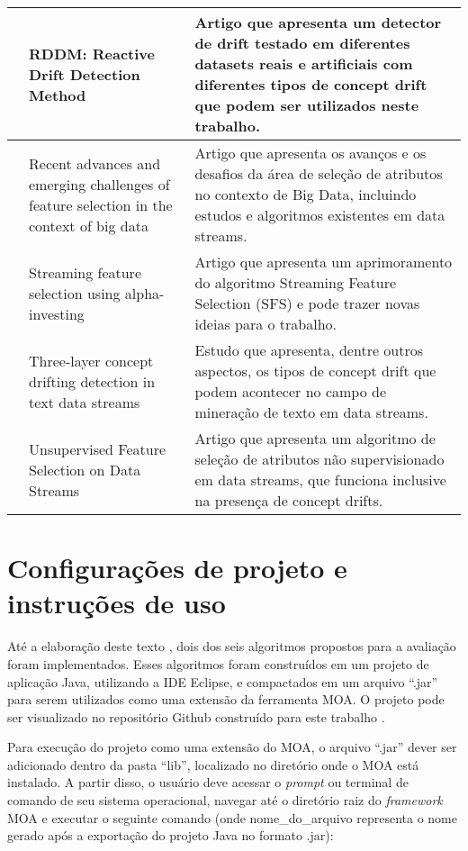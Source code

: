 \begin{longtable}[c]{|p{2.7cm}|p{5cm}|p{7cm}|}
\\ \hline
\cite{Barros2017} & RDDM: Reactive Drift Detection Method & Artigo que apresenta um detector de drift testado em diferentes datasets reais e artificiais com diferentes tipos de concept drift que podem ser utilizados neste trabalho.
\\ \hline
\cite{Bolon-Canedo2015} & Recent advances and emerging challenges of feature selection in the context of big data & Artigo que apresenta os avanços e os desafios da área de seleção de atributos no contexto de Big Data, incluindo estudos e algoritmos existentes em data streams.
\\ \hline
\cite{Zhou2005} & Streaming feature selection using alpha-investing & Artigo que apresenta um aprimoramento do algoritmo Streaming Feature Selection (SFS) e pode trazer novas ideias para o trabalho.
\\ \hline
\cite{Zhang2017} & Three-layer concept drifting detection in text data streams & Estudo que apresenta, dentre outros aspectos, os tipos de concept drift que podem acontecer no campo de mineração de texto em data streams.
\\ \hline
\cite{Huang2015} & Unsupervised Feature Selection on Data Streams & Artigo que apresenta um algoritmo de seleção de atributos não supervisionado em data streams, que funciona inclusive na presença de concept drifts.
\\ \hline
\end{longtable}

\chapter{Configurações de projeto e instruções de uso} \label{chp:ApendiceB}

Até a 
elaboração deste texto
, dois dos seis algoritmos propostos para a avaliação foram implementados. Esses algoritmos foram construídos em um projeto de aplicação Java, utilizando a IDE Eclipse, e compactados em um arquivo ``.jar'' para serem utilizados como uma extensão da ferramenta MOA. O projeto pode ser visualizado no repositório Github construído para este trabalho \cite{githubMbdemoraes}.

Para execução do projeto como uma extensão do MOA, o arquivo ``.jar'' dever ser adicionado dentro da pasta ``lib'', localizado no diretório onde o MOA está instalado. A partir disso, o usuário deve acessar o \textit{prompt} ou terminal de comando de seu sistema operacional, navegar até o diretório raiz do \textit{framework} MOA e executar o seguinte comando (onde nome\_do\_arquivo representa o nome gerado após a exportação do projeto Java no formato .jar):


